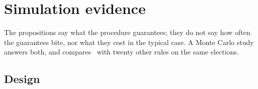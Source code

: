 \section{Simulation evidence}\label{sec:simulation}

The propositions say what the procedure guarantees; they do not say how often the guarantees bite, nor
what they cost in the typical case. A Monte Carlo study answers both, and compares \QVC\ with twenty
other rules on the same elections.

\subsection{Design}

